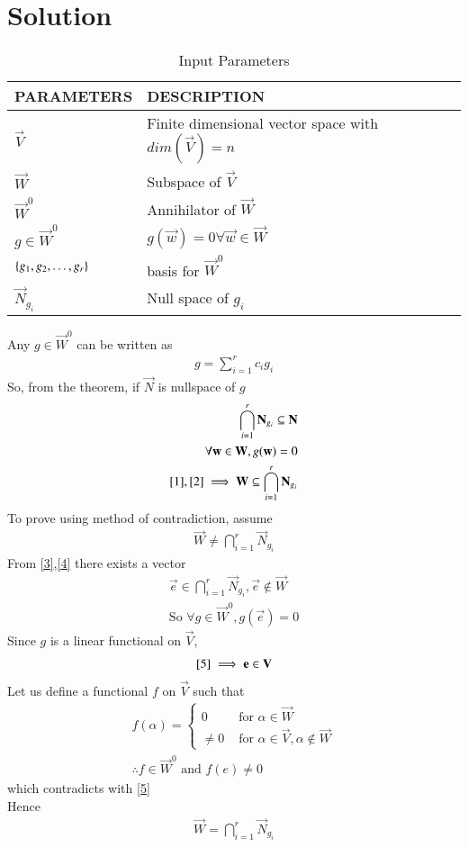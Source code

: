 \documentclass[journal,12pt,twocolumn]{IEEEtran}
\begin{document}
\section{Solution}
\begin{table}[!h]
\centering
\begin{tabular}{|p{3cm}|p{5cm}|}
\hline
\textbf{PARAMETERS}&\textbf{DESCRIPTION}\\
\hline
$\vec{V}$& Finite dimensional vector space with $dim(\vec{V})=n$\\
\hline
$\vec{W}$ & Subspace of $\vec{V}$\\
\hline
$\vec{W}^0$ & Annihilator of $\vec{W}$\\
\hline
$g \in \vec{W}^0$ & $g(\vec{w})=0 \forall \vec{w} \in \vec{W}$\\
\hline
$\cbrak{g_1,g_2,\hdots,g_r}$& basis for $\vec{W}^0$\\
\hline
$\vec{N}_{g_i}$ & Null space of $g_i$\\
\hline
\end{tabular}
\caption{Input Parameters}
\end{table}
Any $g \in \vec{W}^0$ can be written as
\begin{align}
    g=\sum_{i=1}^r c_ig_i
\end{align}
So, from the theorem, if $\vec{N}$ is nullspace of $g$
\begin{align}
    \bigcap_{i=1}^r \vec{N}_{g_i} \subseteq \vec{N}\label{1}\\
    \forall \vec{w} \in \vec{W},g(\vec{w})=0\label{2}\\
   \eqref{1},\eqref{2} \implies \vec{W} \subseteq \bigcap_{i=1}^r \vec{N}_{g_i}\label{3}
\end{align}
To prove using method of contradiction, assume
\begin{align}
   \vec{W} \neq \bigcap_{i=1}^r \vec{N}_{g_i} \label{4}
\end{align}
From \eqref{3},\eqref{4} there exists a vector  
\begin{align}
 \vec{e} \in  \bigcap_{i=1}^r \vec{N}_{g_i}, \vec{e} \notin \vec{W}\\
 \text{So  }\forall g \in \vec{W}^0, g(\vec{e})=0 \label{5}
\end{align}
Since $g$ is a linear functional on $\vec{V}$,
\begin{align}
    \eqref{5} \implies \vec{e} \in \vec{V}
\end{align}
Let us define a functional $f$ on $\vec{V}$ such that 
\begin{align}
    f(\alpha)=
    \begin{cases}
         0 & \text{ for }     \alpha \in \vec{W}\\
        \neq 0 & \text{ for } \alpha \in \vec{V},\alpha \notin \vec{W}
    \end{cases}\\
  \therefore f \in \vec{W}^0 \text{ and } f(e) \neq 0  
\end{align}
which contradicts with \eqref{5}\\
Hence 
\begin{align}
     \vec{W}=\bigcap_{i=1}^r \vec{N}_{g_i}
\end{align}
\end{document}
